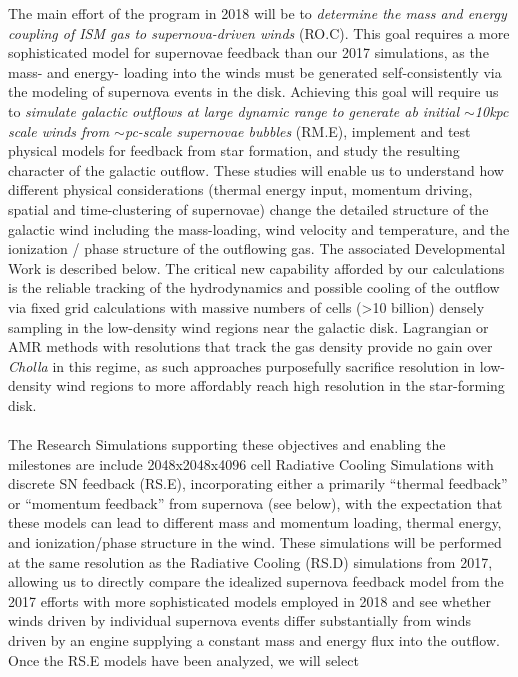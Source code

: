 \documentclass[11pt,letterpaper,english]{article}
\begin{document}
The main effort of the program in 2018 will be to \textit{determine the mass and energy coupling of ISM gas
to supernova-driven winds} (RO.C). This goal requires a more sophisticated model for supernovae feedback than our
2017 simulations, as the mass- and energy- loading into the winds must be generated self-consistently via the
modeling of supernova events in the disk. Achieving this goal will require us to
\textit{simulate galactic outflows at large dynamic
range to generate ab initial $\sim$10kpc scale winds from $\sim$pc-scale supernovae bubbles} (RM.E), 
implement and test physical models for feedback from star formation, and study the resulting character of the galactic outflow. These studies will enable us to understand how different physical considerations (thermal energy input, momentum driving, spatial and time-clustering of supernovae) change the detailed structure of the galactic wind including the mass-loading, wind velocity and temperature, and the ionization / phase structure of the outflowing gas. The associated Developmental Work is described below.
The critical new capability afforded by our calculations is the reliable tracking of the hydrodynamics and possible cooling of the outflow via fixed grid calculations with massive numbers of cells (>10 billion) densely sampling in the low-density wind regions near the galactic disk. Lagrangian or AMR methods with resolutions that track the gas density provide no gain over 
\textit{Cholla} in this regime, as such approaches purposefully sacrifice resolution in low-density wind regions to more affordably reach high resolution in the star-forming disk. 
~\\~\\
The Research Simulations supporting these objectives and enabling the milestones are include 
2048x2048x4096 cell Radiative Cooling Simulations
with discrete SN feedback (RS.E), incorporating
either a primarily ``thermal feedback'' or ``momentum feedback'' from supernova (see below), with the expectation that these
models can lead to different mass and momentum loading, thermal energy, and ionization/phase structure in the wind.  These
simulations will be performed at the same resolution as the Radiative Cooling (RS.D) simulations from 2017, allowing us to
directly compare the idealized supernova feedback model from the 2017 efforts with more sophisticated models employed in
2018 and see whether winds driven by individual supernova events differ substantially from winds driven by an engine
supplying a constant mass and energy flux into the outflow.  Once the RS.E models have been analyzed, we will select
\end{document}
